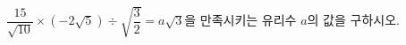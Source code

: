 $\dfrac{15}{\sqrt{10}}\times(-2\sqrt{5})\div\sqrt{\dfrac{3}{2}}=a\sqrt{3}$을 만족시키는 유리수 $a$의 값을 구하시오.
